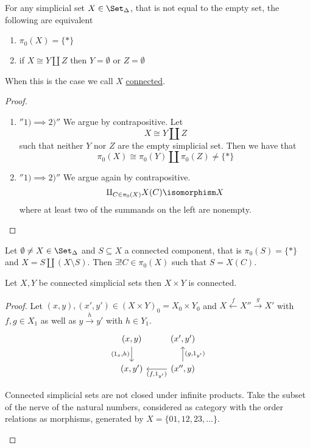 \begin{prop}
    For any simplicial set $X \in \Set_{\Delta}$, that is not equal to the empty set, the following are equivalent 
    \begin{enumerate}
        \item 
        $\pi_0(X)=\{*\}$
        \item 
        if $X \cong Y \amalg Z$ then $Y = \emptyset$ or $Z = \emptyset$
    \end{enumerate}
    When this is the case we call $X$ \underline{connected}.
\end{prop}

\begin{proof}
    \begin{enumerate}
        \item 
        $''1)\implies2)''$
        We argue by contrapositive. 
        Let
        \[
        X \cong Y \amalg Z
        \] 
        such that neither $Y$ nor $Z$ are the empty simplicial set.
        Then we have that 
        \[
        \pi_0(X) \cong \pi_0(Y) \amalg \pi_0(Z) \neq \{ *\}
        \]
        \item 
        $''1)\implies2)''$
        We argue again by contrapositive. 
        \[
        \amalg_{C \in \pi_0(X)} X(C) \isomorphism X
        \]
        where at least two of the summands on the left are nonempty.
    \end{enumerate}
\end{proof}

\begin{prop}
    Let $\emptyset \neq X \in \Set_{\Delta}$ and $S\subseteq X$ a connected component, that is $\pi_0(S)=\{*\}$ and $X=S \amalg (X \setminus S)$.
    Then $\exists!C \in \pi_0(X)$ such that $S=X(C)$.
\end{prop}

\begin{prop}
    Let $X,Y$ be connected simplicial sets then $X  \times Y$ is connected. 
\end{prop}

\begin{proof}
    Let $(x,y),(x',y') \in (X\times Y)_0=X_0 \times Y_0$ and $X \xleftarrow{f}X''\xrightarrow{g}X'$ with $f,g \in X_1$ as well as $y \xrightarrow{h} y'$ with $h \in Y_1$.
    \[
    \begin{tikzcd}
        (x,y)
        \arrow[d,"{( 1_x , h )}"']
        &
        (x',y')
        \\
        (x,y')
        &
        (x'',y)
        \arrow[l, "{(f,1_{y'})}"]
        \arrow[u, "{(g,1_{y'})}"']
    \end{tikzcd}
    \]
    \begin{Warning}
        Connected simplicial sets are not closed under infinite products.
        Take the subset of the nerve of the natural numbers, considered as category with the order relations as morphisms, generated by $X=\{01,12,23, \dotsc\}$.
    \end{Warning}
\end{proof}

